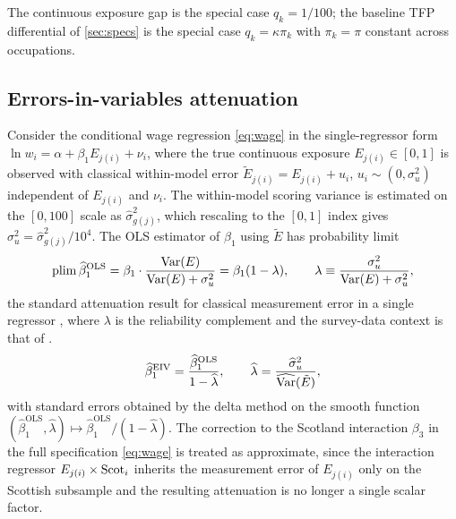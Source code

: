 \noindent
The continuous exposure gap is the special case $q_k = 1/100$; the baseline TFP differential of \cref{sec:specs} is the special case $q_k = \kappa \pi_k$ with $\pi_k = \pi$ constant across occupations.


\subsection{Errors-in-variables attenuation}

Consider the conditional wage regression \cref{eq:wage} in the single-regressor form $\ln w_i = \alpha + \beta_1 E_{j(i)} + \nu_i$, where the true continuous exposure $E_{j(i)} \in [0,1]$ is observed with classical within-model error $\tilde{E}_{j(i)} = E_{j(i)} + u_i$, $u_i \sim (0, \sigma^2_u)$ independent of $E_{j(i)}$ and $\nu_i$. The within-model scoring variance is estimated on the $[0,100]$ scale as $\widehat{\sigma}^2_{g(j)}$, which rescaling to the $[0,1]$ index gives $\sigma^2_u = \widehat{\sigma}^2_{g(j)} / 10^4$. The OLS estimator of $\beta_1$ using $\tilde{E}$ has probability limit
\begin{equation}\label{eq:A9}
\operatorname{plim} \widehat{\beta}^{\mathrm{OLS}}_1
= \beta_1 \cdot \frac{\operatorname{Var}(E)}{\operatorname{Var}(E) + \sigma^2_u}
= \beta_1 (1 - \lambda),
\qquad
\lambda \equiv \frac{\sigma^2_u}{\operatorname{Var}(E) + \sigma^2_u},
\end{equation}
the standard attenuation result for classical measurement error in a single regressor \citep[][ch.~4]{wooldridge2010}, where $\lambda$ is the reliability complement and the survey-data context is that of \citet{bound1991}.
\begin{equation}\label{eq:A10}
\widehat{\beta}^{\mathrm{EIV}}_1
= \frac{\widehat{\beta}^{\mathrm{OLS}}_1}{1 - \widehat{\lambda}},
\qquad
\widehat{\lambda}
= \frac{\widehat{\sigma}^2_u}{\widehat{\operatorname{Var}}(\tilde{E})},
\end{equation}
with standard errors obtained by the delta method on the smooth function $(\widehat{\beta}^{\mathrm{OLS}}_1, \widehat{\lambda}) \mapsto \widehat{\beta}^{\mathrm{OLS}}_1 / (1 - \widehat{\lambda})$. The correction to the Scotland interaction $\beta_3$ in the full specification \cref{eq:wage} is treated as approximate, since the interaction regressor $E_{j(i)} \times \mathrm{Scot}_i$ inherits the measurement error of $E_{j(i)}$ only on the Scottish subsample and the resulting attenuation is no longer a single scalar factor.


